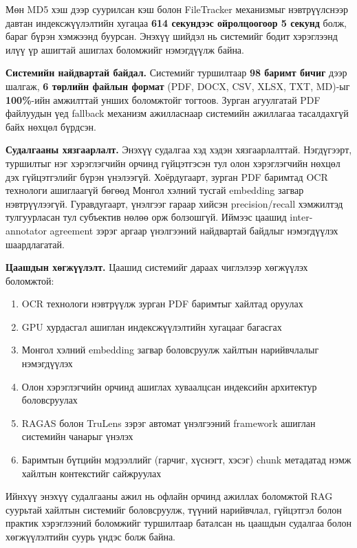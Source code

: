 \documentclass[11pt,a4paper]{article}
\begin{document}
Мөн MD5 хэш дээр суурилсан кэш болон FileTracker механизмыг нэвтрүүлснээр давтан индексжүүлэлтийн хугацаа \textbf{614 секундээс ойролцоогоор 5 секунд} болж, бараг бүрэн хэмжээнд буурсан. Энэхүү шийдэл нь системийг бодит хэрэглээнд илүү үр ашигтай ашиглах боломжийг нэмэгдүүлж байна.

\textbf{Системийн найдвартай байдал.}
Системийг туршилтаар \textbf{98 баримт бичиг} дээр шалгаж, \textbf{6 төрлийн файлын формат} (PDF, DOCX, CSV, XLSX, TXT, MD)-ыг \textbf{100\%}-ийн амжилттай унших боломжтойг тогтоов. Зурган агуулгатай PDF файлуудын үед fallback механизм ажилласнаар системийн ажиллагаа тасалдахгүй байх нөхцөл бүрдсэн.

\textbf{Судалгааны хязгаарлалт.}
Энэхүү судалгаа хэд хэдэн хязгаарлалттай. Нэгдүгээрт, туршилтыг нэг хэрэглэгчийн орчинд гүйцэтгэсэн тул олон хэрэглэгчийн нөхцөл дэх гүйцэтгэлийг бүрэн үнэлээгүй. Хоёрдугаарт, зурган PDF баримтад OCR технологи ашиглаагүй бөгөөд Монгол хэлний тусгай embedding загвар нэвтрүүлээгүй. Гуравдугаарт, үнэлгээг гараар хийсэн precision/recall хэмжилтэд тулгуурласан тул субъектив нөлөө орж болзошгүй. Иймээс цаашид inter-annotator agreement зэрэг аргаар үнэлгээний найдвартай байдлыг нэмэгдүүлэх шаардлагатай.

\textbf{Цаашдын хөгжүүлэлт.}
Цаашид системийг дараах чиглэлээр хөгжүүлэх боломжтой:

\begin{enumerate}
\item OCR технологи нэвтрүүлж зурган PDF баримтыг хайлтад оруулах
\item GPU хурдасгал ашиглан индексжүүлэлтийн хугацааг багасгах
\item Монгол хэлний embedding загвар боловсруулж хайлтын нарийвчлалыг нэмэгдүүлэх
\item Олон хэрэглэгчийн орчинд ашиглах хуваалцсан индексийн архитектур боловсруулах
\item RAGAS болон TruLens зэрэг автомат үнэлгээний framework ашиглан системийн чанарыг үнэлэх
\item Баримтын бүтцийн мэдээллийг (гарчиг, хүснэгт, хэсэг) chunk метадатад нэмж хайлтын контекстийг сайжруулах
\end{enumerate}

Ийнхүү энэхүү судалгааны ажил нь офлайн орчинд ажиллах боломжтой RAG суурьтай хайлтын системийг боловсруулж, түүний нарийвчлал, гүйцэтгэл болон практик хэрэглээний боломжийг туршилтаар баталсан нь цаашдын судалгаа болон хөгжүүлэлтийн суурь үндэс болж байна.
\newpage
\end{document}
